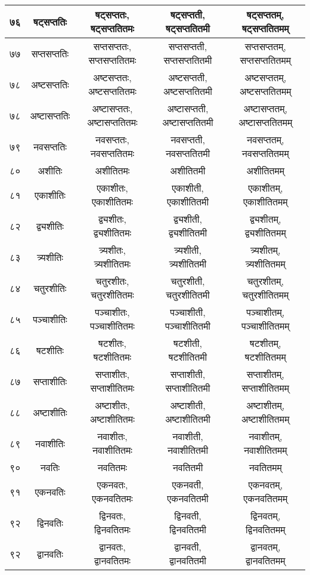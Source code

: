 \documentclass[leqno,fleqn,12pt]{article}%
\begin{document}
\begin{center}
\begin{supertabular}{|lc|c|c|c|}
७६ & षट्सप्ततिः & षट्सप्ततः, षट्सप्ततितमः & षट्सप्तती, षट्सप्ततितमी & षट्सप्ततम्, षट्सप्ततितमम् \\ \hline 
७७ & सप्तसप्ततिः & सप्तसप्ततः, सप्तसप्ततितमः & सप्तसप्तती, सप्तसप्ततितमी & सप्तसप्ततम्, सप्तसप्ततितमम् \\ \hline 
७८ & अष्टसप्ततिः & अष्टसप्ततः, अष्टसप्ततितमः & अष्टसप्तती, अष्टसप्ततितमी & अष्टसप्ततम्, अष्टसप्ततितमम् \\ \hline 
७८ & अष्टासप्ततिः & अष्टासप्ततः, अष्टासप्ततितमः & अष्टासप्तती, अष्टासप्ततितमी & अष्टासप्ततम्, अष्टासप्ततितमम् \\ \hline 
७९ & नवसप्ततिः & नवसप्ततः, नवसप्ततितमः & नवसप्तती, नवसप्ततितमी & नवसप्ततम्, नवसप्ततितमम् \\ \hline 
८० & अशीतिः & अशीतितमः & अशीतितमी & अशीतितमम् \\ \hline 
८१ & एकाशीतिः & एकाशीतः, एकाशीतितमः & एकाशीती, एकाशीतितमी & एकाशीतम्, एकाशीतितमम् \\ \hline 
८२ & द्व्यशीतिः & द्व्यशीतः, द्व्यशीतितमः & द्व्यशीती, द्व्यशीतितमी & द्व्यशीतम्, द्व्यशीतितमम् \\ \hline 
८३ & त्र्यशीतिः & त्र्यशीतः, त्र्यशीतितमः & त्र्यशीती, त्र्यशीतितमी & त्र्यशीतम्, त्र्यशीतितमम् \\ \hline 
८४ & चतुरशीतिः & चतुरशीतः, चतुरशीतितमः & चतुरशीती, चतुरशीतितमी & चतुरशीतम्, चतुरशीतितमम् \\ \hline 
८५ & पञ्चाशीतिः & पञ्चाशीतः, पञ्चाशीतितमः & पञ्चाशीती, पञ्चाशीतितमी & पञ्चाशीतम्, पञ्चाशीतितमम् \\ \hline 
८६ & षटशीतिः & षटशीतः, षटशीतितमः & षटशीती, षटशीतितमी & षटशीतम्, षटशीतितमम् \\ \hline 
८७ & सप्ताशीतिः & सप्ताशीतः, सप्ताशीतितमः & सप्ताशीती, सप्ताशीतितमी & सप्ताशीतम्, सप्ताशीतितमम् \\ \hline 
८८ & अष्टाशीतिः & अष्टाशीतः, अष्टाशीतितमः & अष्टाशीती, अष्टाशीतितमी & अष्टाशीतम्, अष्टाशीतितमम् \\ \hline 
८९ & नवाशीतिः & नवाशीतः, नवाशीतितमः & नवाशीती, नवाशीतितमी & नवाशीतम्, नवाशीतितमम् \\ \hline 
९० & नवतिः & नवतितमः & नवतितमी & नवतितमम् \\ \hline 
९१ & एकनवतिः & एकनवतः, एकनवतितमः & एकनवती, एकनवतितमी & एकनवतम्, एकनवतितमम् \\ \hline 
९२ & द्विनवतिः & द्विनवतः, द्विनवतितमः & द्विनवती, द्विनवतितमी & द्विनवतम्, द्विनवतितमम् \\ \hline 
९२ & द्वानवतिः & द्वानवतः, द्वानवतितमः & द्वानवती, द्वानवतितमी & द्वानवतम्, द्वानवतितमम् \\ \hline 

\end{supertabular}
\end{center}
\end{document}

